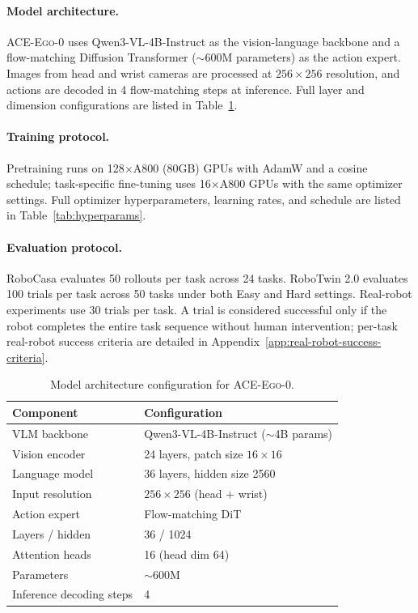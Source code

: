 \documentclass{llmxive}
\providecommand{\OURS}{\textsc{ACE-Ego-0}\xspace}
\providecommand{\Ours}{\OURS}
\providecommand{\arraystretch}{1.1}
\begin{document}
\paragraph{Model architecture.}
\Ours uses Qwen3-VL-4B-Instruct as the vision-language backbone and a
flow-matching Diffusion Transformer ($\sim$600M parameters) as the action
expert. Images from head and wrist cameras are processed at $256{\times}256$
resolution, and actions are decoded in 4 flow-matching steps at inference.
Full layer and dimension configurations are listed in
Table~\ref{tab:architecture}.

\paragraph{Training protocol.}
Pretraining runs on 128$\times$A800 (80GB) GPUs with AdamW and a
cosine schedule; task-specific fine-tuning uses 16$\times$A800 GPUs with the
same optimizer settings. Full optimizer hyperparameters, learning rates, and
schedule are listed in Table~\ref{tab:hyperparams}.

\paragraph{Evaluation protocol.}
RoboCasa evaluates 50 rollouts per task across 24 tasks. RoboTwin 2.0
evaluates 100 trials per task across 50 tasks under both Easy and Hard
settings. Real-robot experiments use 30 trials per task.
A trial is considered successful only if the robot completes the entire task
sequence without human intervention; per-task real-robot success criteria are
detailed in Appendix~\ref{app:real-robot-success-criteria}.

\begin{table}[htbp]
\centering
\small
\renewcommand{\arraystretch}{1.1}
\begin{tabular}{ll}
\toprule
\textbf{Component} & \textbf{Configuration} \\
\midrule
VLM backbone              & Qwen3-VL-4B-Instruct ($\sim$4B params) \\
\quad Vision encoder      & 24 layers, patch size $16{\times}16$ \\
\quad Language model      & 36 layers, hidden size 2560 \\
Input resolution          & $256{\times}256$ (head + wrist) \\
\midrule
Action expert             & Flow-matching DiT \\
\quad Layers / hidden     & 36 / 1024 \\
\quad Attention heads     & 16 (head dim 64) \\
\quad Parameters          & $\sim$600M \\
Inference decoding steps  & 4 \\
\bottomrule
\end{tabular}
\caption{Model architecture configuration for \Ours.}
\label{tab:architecture}
\end{table}
\end{document}
